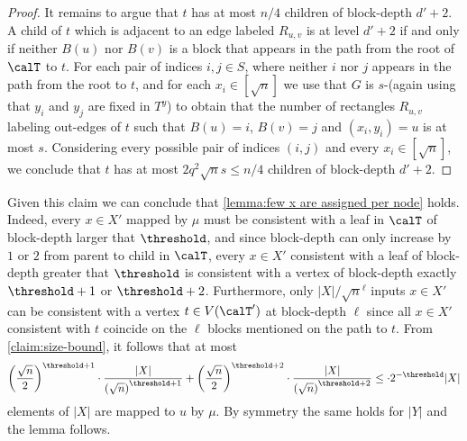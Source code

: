 {\begin{proof}
    It remains to argue that $t$ has at most ${n}/4$ children of 
    block-depth $d' + 2$. A child of $t$ which is adjacent to an edge labeled $R_{u,v}$ is at level $d' + 2$ if and only if neither $B(u)$ nor $B(v)$ is a block that appears in the path from the root of $\calT$ to $t$. For each pair of indices $i,j \in S$, where neither $i$ nor $j$ appears in the path from the root to $t$, and for each $x_i \in [\sqrt{n}]$ we use that $G$ is $s$-\ndense (again using that $y_i$ and $y_j$ are fixed in $T^y$) to obtain that the number of rectangles $R_{u,v}$ labeling out-edges of $t$ such that  $B(u) = i$, $B(v) = j$ and $(x_i,y_i) = u$ is at most 
    $s$.
% 
    Considering every possible pair of indices $(i,j)$ and every $x_i \in [\sqrt{n}]$, we conclude that $t$ has at most $2 q^2 \sqrt{n} s \leq n/4$ children of 
    block-depth $d' + 2$. 
\end{proof}
}

Given this claim we can conclude that \autoref{lemma:few x are assigned per node} holds.
Indeed, every $x\in X'$ mapped by $\mu$ must be consistent with a leaf in $\calT$ of block-depth larger that $\threshold$, and
since block-depth can only increase by $1$ or $2$ from parent to child in $\calT$, every $x\in X'$ consistent with a leaf of block-depth greater that $\threshold$ is consistent with a vertex of block-depth exactly $\threshold+1$ or $\threshold +2$. 
Furthermore, only $\lvert X \rvert/\sqrt{n}^\ell$ inputs $x\in X'$ can be consistent with a vertex $t\in V(\calT')$ at block-depth $\ell$ since all $x\in X'$ consistent with $t$ coincide on the $\ell$ blocks mentioned on the path to $t$. 
% 
From \autoref{claim:size-bound}, it follows that at most
\begin{equation*}
    \left(\frac{\sqrt{n}}{2}\right)^{\threshold +1}
    \cdot
    \frac{\lvert X\rvert}{\left(\sqrt{n}\right)^{\threshold + 1}}
    +
    \left(\frac{\sqrt{n}}{2}\right)^{\threshold+2}
    \cdot
    \frac{\lvert X\rvert}{\left(\sqrt{n}\right)^{\threshold+2}}   
    \leq \cdot2^{-\threshold}\lvert X \rvert 
\end{equation*} elements of $\lvert X\rvert $ are mapped to $u$ by $\mu$. By symmetry the same holds for $\lvert Y\rvert$ and the lemma follows.

